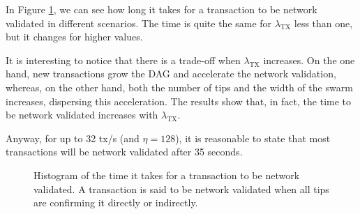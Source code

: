 In Figure \ref{fig:hathor-network-validated}, we can see how long it takes for a transaction to be network validated in different scenarios. The time is quite the same for $\lambda_\text{TX}$ less than one, but it changes for higher values.

It is interesting to notice that there is a trade-off when $\lambda_\text{TX}$ increases. On the one hand, new transactions grow the DAG and accelerate the network validation, whereas, on the other hand, both the number of tips and the width of the swarm increases, dispersing this acceleration. The results show that, in fact, the time to be network validated increases with $\lambda_\text{TX}$.

Anyway, for up to 32 tx/s (and $\eta=128$), it is reasonable to state that most transactions will be network validated after 35 seconds.

\begin{figure}[!htb]
\centering
{}


\caption{Histogram of the time it takes for a transaction to be network validated. A transaction is said to be network validated when all tips are confirming it directly or indirectly. \label{fig:hathor-network-validated}}
\end{figure}


